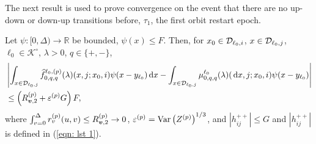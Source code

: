  The next result is used to prove convergence on the event that there are no up-down or down-up transitions before, \(\tau_1\), the first orbit restart epoch.
 \begin{lem}\label{lem: Dcoajc}
	Let \(\psi:[0,\Delta)\to \mathbb R\) be bounded, \(\psi(x)\leq F\). Then, for \(x_0\in\mathcal{D}_{\ell_0,i}\), \(x\in\mathcal{D}_{\ell_0,j}\), \(\ell_0\in\mathcal K^\circ\), \(\lambda > 0\), \(q\in\{+,-\}\), 
	\begin{align}
		&\left|\int_{x\in\mathcal D_{\ell_0,j}} \widehat f^{\ell_0,(p)}_{0,q,q}(\lambda)(x,j; x_0,i)\psi(x-y_{\ell_0})\, \mathrm{d} x - \int_{x\in\mathcal D_{\ell_0,j}} \mu^{\ell_0}_{0,q,q}(\lambda)(\, \mathrm{d} x,j; x_0,i)\psi(x-y_{\ell_0})\right| \nonumber 
		\\&\leq \left(R_{{\boldsymbol v},2}^{(p)} + \varepsilon^{(p)}G\right) F,
		\label{eqn: anue}
	\end{align} 
	where \( \int_{v=0}^\Delta r_v^{(p)}(u,v) \leq R_{{\boldsymbol v},2}^{(p)} \to 0\), \(\varepsilon^{(p)}=\mathrm{Var}\left(Z^{(p)}\right)^{1/3}\), and \(|h_{ij}^{++}|\leq G\) and \(|h_{ij}^{++}|\) is defined in (\ref{eqn: lst 1}). 
\end{lem}

